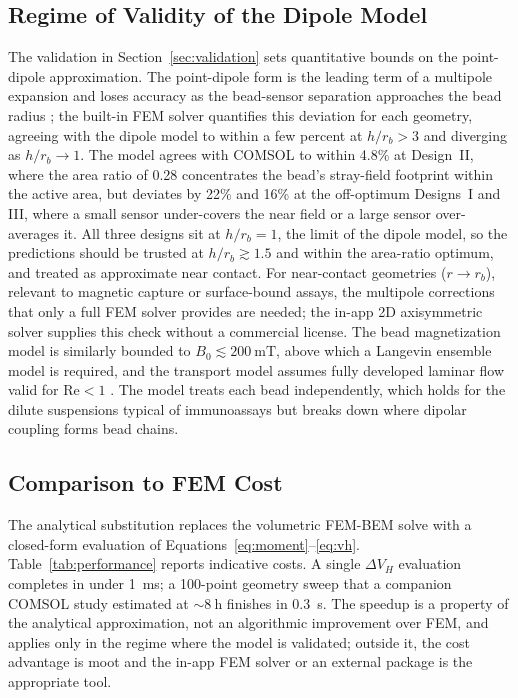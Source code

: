 \documentclass[biosensors,article,submit,pdftex,moreauthors]{Definitions/mdpi}
\begin{document}
\subsection{Regime of Validity of the Dipole Model}

The validation in Section~\ref{sec:validation} sets quantitative bounds on the
point-dipole approximation. The point-dipole form is the leading term of a
multipole expansion and loses accuracy as the bead-sensor separation approaches
the bead radius \cite{griffiths}; the built-in FEM solver quantifies this
deviation for each geometry, agreeing with the dipole model to within a few
percent at $h/r_b > 3$ and diverging as $h/r_b \to 1$. The model agrees with
COMSOL to within 4.8\% at Design~II, where the area ratio of 0.28 concentrates the
bead's stray-field footprint within the active area, but deviates by 22\% and 16\% at
the off-optimum Designs~I and III, where a small sensor under-covers the near field or
a large sensor over-averages it. All three designs sit at $h/r_b = 1$, the limit of the
dipole model, so the predictions should be trusted at $h/r_b \gtrsim 1.5$ and within the
area-ratio optimum, and treated as approximate near contact. For near-contact
geometries ($r \to r_b$), relevant to magnetic capture or surface-bound assays, the
multipole corrections that only a full FEM solver provides are needed; the in-app 2D
axisymmetric solver supplies this check without a commercial license. The bead
magnetization model is similarly bounded to $B_0 \lesssim \SI{200}{\milli\tesla}$,
above which a Langevin ensemble model is required, and the transport model assumes
fully developed laminar flow valid for $\text{Re} < 1$ \cite{hewlin2023}. The model
treats each bead independently, which holds for the dilute suspensions typical of
immunoassays but breaks down where dipolar coupling forms bead chains.

\subsection{Comparison to FEM Cost}

The analytical substitution replaces the volumetric FEM-BEM solve with a closed-form
evaluation of Equations~\eqref{eq:moment}--\eqref{eq:vh}.
Table~\ref{tab:performance} reports indicative costs. A single $\Delta V_H$ evaluation
completes in under \SI{1}{\milli\second}; a 100-point geometry sweep that a companion
COMSOL study estimated at ${\sim}\SI{8}{\hour}$ \cite{govindaraju2025} finishes in
\SI{0.3}{\second}. The speedup is a property of the analytical approximation, not an
algorithmic improvement over FEM, and applies only in the regime where the model is
validated; outside it, the cost advantage is moot and the in-app FEM solver or an
external package is the appropriate tool.
\end{document}
